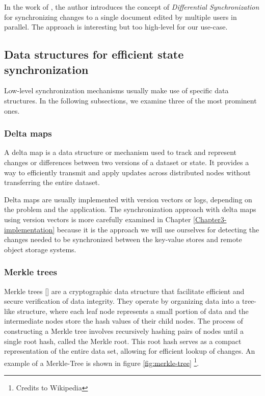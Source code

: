 In the work of \cite{fraser-diff-sync}, the author introduces the concept of \textit{Differential Synchronization} for synchronizing changes to a single document edited by multiple users in parallel. The approach is interesting but too high-level for our use-case.

\subsection{Data structures for efficient state synchronization}
\label{data-structs-sync}

Low-level synchronization mechanisms usually make use of specific data structures. In the following subsections, we examine three of the most prominent ones.

\subsubsection{Delta maps}

A delta map is a data structure or mechanism used to track and represent changes or differences between two versions of a dataset or state. It provides a way to efficiently transmit and apply updates across distributed nodes without transferring the entire dataset.

Delta maps are usually implemented with version vectors or logs, depending on the problem and the application. The synchronization approach with delta maps using version vectors is more carefully examined in Chapter \ref{Chapter3-implementation} because it is the approach we will use ourselves for detecting the changes needed to be synchronized between the key-value stores and remote object storage systems.

\subsubsection{Merkle trees}

Merkle trees [\cite{merkle-trees}] are a cryptographic data structure that facilitate efficient and secure verification of data integrity. They operate by organizing data into a tree-like structure, where each leaf node represents a small portion of data and the intermediate nodes store the hash values of their child nodes. The process of constructing a Merkle tree involves recursively hashing pairs of nodes until a single root hash, called the Merkle root. This root hash serves as a compact representation of the entire data set, allowing for efficient lookup of changes. An example of a Merkle-Tree is shown in figure \ref{fig:merkle-tree} \footnote{Credits to Wikipedia}.

